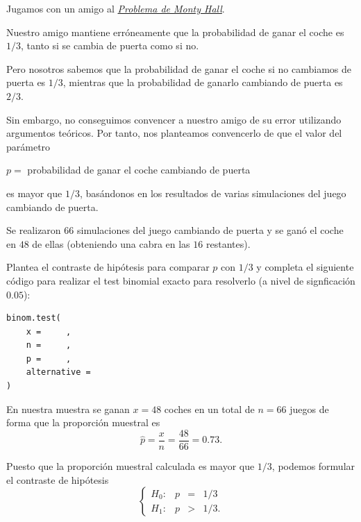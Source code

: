 \documentclass[
  notoc,
  nobib,
  degree=inf]{mnye}
\begin{document}
\begin{ex}

Jugamos con un amigo al \href{https://www.mathwarehouse.com/monty-hall-simulation-online/}{\emph{Problema de Monty Hall}}.

Nuestro amigo mantiene erróneamente que la probabilidad de ganar el coche es \(1/3\), tanto si se cambia de puerta como si no.

Pero nosotros sabemos que la probabilidad de ganar el coche si no cambiamos de puerta es \(1/3\), mientras que la probabilidad de ganarlo cambiando de puerta es \(2/3\).

Sin embargo, no conseguimos convencer a nuestro amigo de su error utilizando argumentos teóricos. Por tanto, nos planteamos convencerlo de que el valor del parámetro

\begin{center}
\(p =\)
probabilidad de ganar el coche cambiando de puerta

\end{center}

es mayor que \(1/3\), basándonos en los resultados de varias simulaciones del juego cambiando de puerta.

Se realizaron \(66\) simulaciones del juego cambiando de puerta y se ganó el coche en \(48\) de ellas (obteniendo una cabra en las \(16\) restantes).

\begin{parts}

\item

Plantea el contraste de hipótesis para comparar \(p\) con \(1/3\) y completa el siguiente código para realizar el test binomial exacto para resolverlo (a nivel de signficación \(0.05\)):

\begin{verbatim}
binom.test(
    x =     ,
    n =     ,
    p =     ,
    alternative =
)
\end{verbatim}

\begin{sol}

En nuestra muestra se ganan \(x=48\) coches en un total de \(n=66\) juegos de forma que la proporción muestral es
\[
\hat p = \frac{x}{n} = \frac{48}{66}  = 0.73.
\]

Puesto que la proporción muestral calculada es mayor que \(1/3\), podemos formular el contraste de hipótesis
\[
  \left\{
  \begin{array}{lrcl}
    H_0:&p&=&1/3\\
    H_1:&p&>&1/3.
  \end{array}
  \right.
\]


\end{sol}
\end{parts}
\end{ex}
\end{document}
